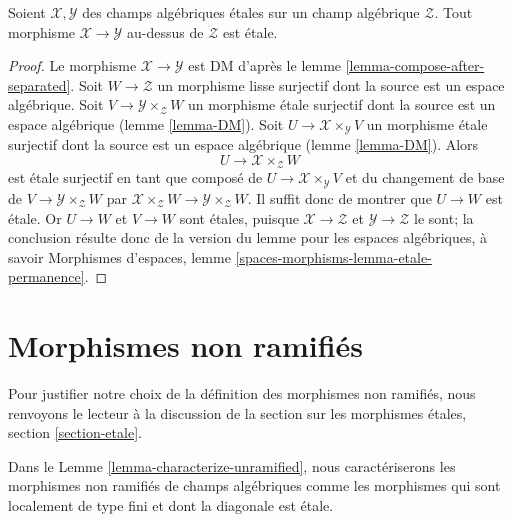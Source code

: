 \begin{lemma}
\label{lemma-etale-permanence}
Soient $\mathcal{X}, \mathcal{Y}$ des champs alg\'ebriques \'etales sur
un champ alg\'ebrique $\mathcal{Z}$. Tout morphisme
$\mathcal{X} \to \mathcal{Y}$ au-dessus de $\mathcal{Z}$ est \'etale.
\end{lemma}

\begin{proof}
Le morphisme $\mathcal{X} \to \mathcal{Y}$ est DM d'apr\`es
le lemme \ref{lemma-compose-after-separated}.
Soit $W \to \mathcal{Z}$ un morphisme lisse surjectif
dont la source est un espace alg\'ebrique. Soit
$V \to \mathcal{Y} \times_\mathcal{Z} W$ un morphisme \'etale surjectif
dont la source est un espace alg\'ebrique
(lemme \ref{lemma-DM}).
Soit $U \to \mathcal{X} \times_\mathcal{Y} V$ un morphisme \'etale surjectif
dont la source est un espace alg\'ebrique
(lemme \ref{lemma-DM}).
Alors
$$
U \longrightarrow \mathcal{X} \times_\mathcal{Z} W
$$
est \'etale surjectif en tant que compos\'e de
$U \to \mathcal{X} \times_\mathcal{Y} V$
et du changement de base de $V \to \mathcal{Y} \times_\mathcal{Z} W$
par $\mathcal{X} \times_\mathcal{Z} W \to \mathcal{Y} \times_\mathcal{Z} W$.
Il suffit donc de montrer que $U \to W$ est \'etale.
Or $U \to W$ et $V \to W$ sont \'etales, puisque
$\mathcal{X} \to \mathcal{Z}$ et $\mathcal{Y} \to \mathcal{Z}$
le sont; la conclusion r\'esulte donc de la version du lemme pour les
espaces alg\'ebriques, \`a savoir
Morphismes d'espaces, lemme \ref{spaces-morphisms-lemma-etale-permanence}.
\end{proof}








\section{Morphismes non ramifi\'es}
\label{section-unramified}

\noindent
Pour justifier notre choix de la d\'efinition des morphismes
non ramifi\'es, nous renvoyons le lecteur \`a la discussion
de la section sur les morphismes \'etales, section \ref{section-etale}.

\medskip\noindent
Dans le Lemme \ref{lemma-characterize-unramified}, nous caract\'eriserons
les morphismes non ramifi\'es de champs alg\'ebriques comme les morphismes
qui sont localement de type fini et dont la diagonale est \'etale.

